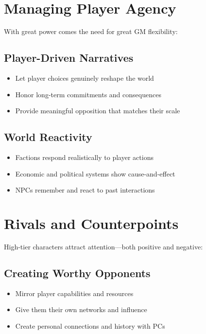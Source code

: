 \section{Managing Player Agency}

With great power comes the need for great GM flexibility:

\subsection*{Player-Driven Narratives}

\begin{itemize}
    \item Let player choices genuinely reshape the world
    \item Honor long-term commitments and consequences
    \item Provide meaningful opposition that matches their scale
\end{itemize}

\subsection*{World Reactivity}

\begin{itemize}
    \item Factions respond realistically to player actions
    \item Economic and political systems show cause-and-effect
    \item NPCs remember and react to past interactions
\end{itemize}

\section{Rivals and Counterpoints}

High-tier characters attract attention—both positive and negative:

\subsection*{Creating Worthy Opponents}

\begin{itemize}
    \item Mirror player capabilities and resources
    \item Give them their own networks and influence
    \item Create personal connections and history with PCs
\end{itemize}


